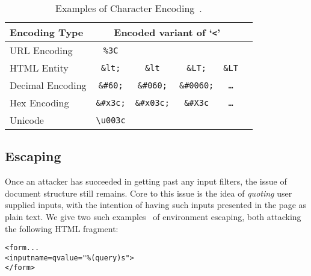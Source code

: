 \documentclass{acmtrans2m}
\begin{document}
\begin{table}[ht]
\centering 
\begin{tabular}{l|ccccc}
 \textbf{Encoding Type} & \multicolumn{4}{c}{\textbf{Encoded variant of `\texttt{<}'}} \\
 \hline
 URL Encoding           & \texttt{\%3C} &&&\\
 HTML Entity            & \texttt{\&lt;} & \texttt{\&lt} & \texttt{\&LT;} & \texttt{\&LT} \\
 Decimal Encoding       & \texttt{\&\#60;} & \texttt{\&\#060;} & \texttt{\&\#0060;} & \texttt{\ldots} \\
 Hex Encoding           & \texttt{\&\#x3c;} & \texttt{\&\#x03c;} & \texttt{\&\#X3c} & \texttt{\ldots} \\
 Unicode                & \texttt{\textbackslash u003c} &&&\\
\end{tabular}
\caption[Submanifold]{Examples of Character Encoding~\cite{secubat}.}
\label{tab:html-encoding}
\end{table}

\subsection{Escaping}\label{sec:escaping}
Once an attacker has succeeded in getting past any input filters, the issue of document structure still remains.
Core to this issue is the idea of \emph{quoting} user supplied inputs, with the intention of having such inputs presented in the page as plain text.
We give two such examples~\cite{article-xss} of environment escaping, both attacking the following HTML fragment:

\begin{alltt}
  <form ...
    <input name=q value="\%(query)s">
  </form>
\end{alltt}
\end{document}
